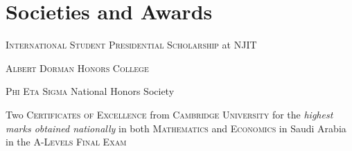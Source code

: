 \documentclass[a4paper,10pt]{article}
\newenvironment{packed-list}{
  \vspace{2pt}
  \begin{itemize}[itemsep=1pt,partopsep=0pt,leftmargin=1.5em]
    \setlength{\parskip}{0pt}
    \setlength{\partopsep}{9pt}
    \setlength{\parsep}{0pt}
    \setlength{\topsep}{0pt}
} {\end{itemize}}
\begin{document}
\section{Societies and Awards}
\vspace{3pt}
\begin{packed-list}
  \item\textsc{International Student Presidential Scholarship} at NJIT
  \item\textsc{Albert Dorman Honors College}
  \item\textsc{Phi Eta Sigma} National Honors Society
  \item Two \textsc{Certificates of Excellence} from \textsc{Cambridge
    University} for the \emph{highest marks obtained nationally} in both
    \textsc{Mathematics} and \textsc{Economics} in Saudi Arabia in the
    \textsc{A-Levels Final Exam}
\end{packed-list}
\end{document}
